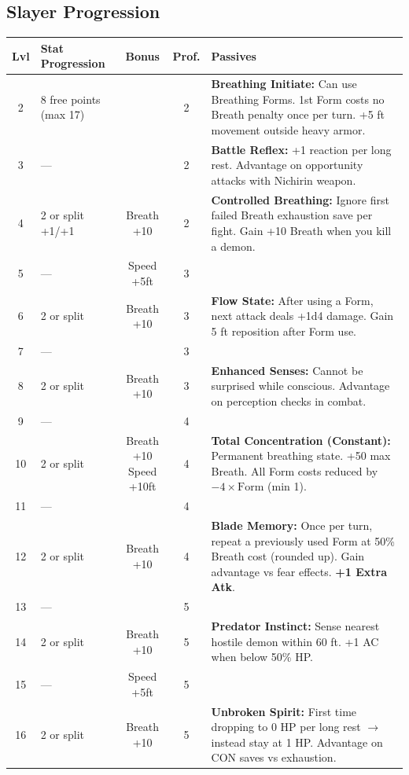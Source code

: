 \documentclass[a4paper, 10pt]{article}
\begin{document}
\subsection*{Slayer Progression}
\noindent
\renewcommand{\arraystretch}{1.3}
\begin{tabularx}{\textwidth}{c l c c X}
\toprule
\textbf{Lvl} & \textbf{Stat Progression} & \textbf{Bonus} & \textbf{Prof.} & \textbf{Passives} \\
\midrule
2 & 8 free points (max 17) & & 2 & \textbf{Breathing Initiate:} Can use Breathing Forms. 1st Form costs no Breath penalty once per turn. +5 ft movement outside heavy armor. \\
3 & — & & 2 & \textbf{Battle Reflex:} +1 reaction per long rest. Advantage on opportunity attacks with Nichirin weapon. \\
4 & 2 or split +1/+1 & Breath +10 & 2 & \textbf{Controlled Breathing:} Ignore first failed Breath exhaustion save per fight. Gain +10 Breath when you kill a demon. \\
5 & — & Speed +5ft & 3 & \\
6 & 2 or split & Breath +10 & 3 & \textbf{Flow State:} After using a Form, next attack deals +1d4 damage. Gain 5 ft reposition after Form use. \\
7 & — & & 3 & \\
8 & 2 or split & Breath +10 & 3 & \textbf{Enhanced Senses:} Cannot be surprised while conscious. Advantage on perception checks in combat. \\
9 & — & & 4 & \\
10 & 2 or split & \makecell{Breath +10 \\ Speed +10ft} & 4 & \textbf{Total Concentration (Constant):} Permanent breathing state. +50 max Breath. All Form costs reduced by $-4 \times \text{Form}$ (min 1). \\
11 & — & & 4 & \\
12 & 2 or split & Breath +10 & 4 & \textbf{Blade Memory:} Once per turn, repeat a previously used Form at 50\% Breath cost (rounded up). Gain advantage vs fear effects. \textbf{+1 Extra Atk}. \\
13 & — & & 5 & \\
14 & 2 or split & Breath +10 & 5 & \textbf{Predator Instinct:} Sense nearest hostile demon within 60 ft. +1 AC when below 50\% HP. \\
15 & — & Speed +5ft & 5 & \\
16 & 2 or split & Breath +10 & 5 & \textbf{Unbroken Spirit:} First time dropping to 0 HP per long rest $\rightarrow$ instead stay at 1 HP. Advantage on CON saves vs exhaustion. \\

\end{tabularx}
\end{document}
